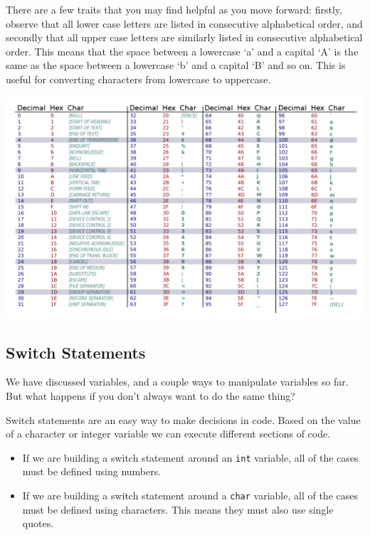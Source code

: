 There are a few traits that you may find helpful as you move forward: firstly, observe that all lower case letters are listed in consecutive alphabetical order, and secondly that all upper case letters are similarly listed in consecutive alphabetical order. This means that the space between a lowercase `a' and a capital `A' is the same as the space between a lowercase `b' and a capital `B' and so on. This is useful for converting characters from lowercase to uppercase. 

\includegraphics[width=\textwidth]{images/ascii_table.png}

\subsection{Switch Statements}

We have discussed variables, and a couple ways to manipulate variables so far. But what happens if you don't always want to do the same thing? 

Switch statements are an easy way to make decisions in code. Based on the value of a character or integer variable we can execute different sections of code. 
\begin{itemize}
    \item If we are building a switch statement around an \texttt{int} variable, all of the cases must be defined using numbers. 
    \item If we are building a switch statement around a \texttt{char} variable, all of the cases must be defined using characters. This means they must also use single quotes. 
\end{itemize}

